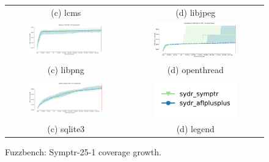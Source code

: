 \begin{figure}[t]
{\begin{tabular}{cc}
            (c) lcms                                                                                                 & (d) libjpeg                                                                                                    \\[6pt]
            \includegraphics[width=0.65\textwidth]{assets/fuzzbench/symptr-25-1/libpng-1.2.56_coverage_growth.png}   & \includegraphics[width=0.65\textwidth]{assets/fuzzbench/symptr-25-1/openthread-2019-12-23_coverage_growth.png} \\
            (c) libpng                                                                                               & (d) openthread                                                                                                 \\[6pt]
            \includegraphics[width=0.65\textwidth]{assets/fuzzbench/symptr-25-1/sqlite3_ossfuzz_coverage_growth.png} & \includegraphics[width=0.65\textwidth]{assets/fuzzbench/symptr-25-1/fuzzbench-legend.png}                      \\
            (c) sqlite3                                                                                              & (d) legend                                                                                                     \\[6pt]
        \end{tabular}
    }
    \caption{Fuzzbench: Symptr-25-1 coverage growth.}
    \label{fig:fuzzbench:symptr-25-1}
\end{figure}

